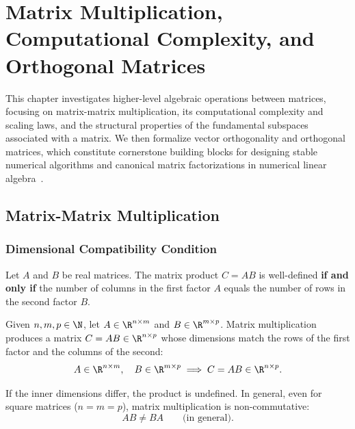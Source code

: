 \chapter{Matrix Multiplication, Computational Complexity, and Orthogonal Matrices}
\label{chap:matrix-multiplication-complexity-orthogonality}

This chapter investigates higher-level algebraic operations between matrices, focusing on matrix-matrix multiplication, its computational complexity and scaling laws, and the structural properties of the fundamental subspaces associated with a matrix. We then formalize vector orthogonality and orthogonal matrices, which constitute cornerstone building blocks for designing stable numerical algorithms and canonical matrix factorizations in numerical linear algebra~\cite{trefethen1997numerical}.

\FloatBarrier
\section{Matrix-Matrix Multiplication}

\subsection{Dimensional Compatibility Condition}

Let $A$ and $B$ be real matrices. The matrix product $C = AB$ is well-defined \textbf{if and only if} the number of columns in the first factor $A$ equals the number of rows in the second factor $B$.

\begin{definition}
Given $n, m, p \in \N$, let $A \in \R^{n \times m}$ and $B \in \R^{m \times p}$. Matrix multiplication produces a matrix $C = AB \in \R^{n \times p}$ whose dimensions match the rows of the first factor and the columns of the second:
\begin{equation}
    A \in \R^{n \times m}, \quad B \in \R^{m \times p} \implies C = AB \in \R^{n \times p}.
\end{equation}
\end{definition}

If the inner dimensions differ, the product is undefined. In general, even for square matrices ($n = m = p$), matrix multiplication is non-commutative:
\begin{equation}
    AB \neq BA \qquad \text{(in general)}.
\end{equation}

